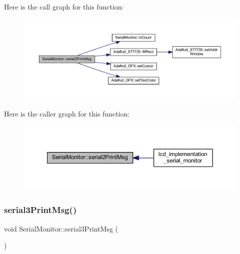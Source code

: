 Here is the call graph for this function\+:
\nopagebreak
\begin{figure}[H]
\begin{center}
\leavevmode
\includegraphics[width=350pt]{d3/dd4/class_serial_monitor_adca14d5a90debc9e60b84e3aff902d20_cgraph}
\end{center}
\end{figure}
Here is the caller graph for this function\+:
\nopagebreak
\begin{figure}[H]
\begin{center}
\leavevmode
\includegraphics[width=350pt]{d3/dd4/class_serial_monitor_adca14d5a90debc9e60b84e3aff902d20_icgraph}
\end{center}
\end{figure}
\mbox{\label{class_serial_monitor_a2e2164f6a67a339e28e0fe566954fa06}} 
\subsubsection{\texorpdfstring{serial3\+Print\+Msg()}{serial3PrintMsg()}}
{\footnotesize\ttfamily void Serial\+Monitor\+::serial3\+Print\+Msg (\begin{DoxyParamCaption}{ }\end{DoxyParamCaption})}

